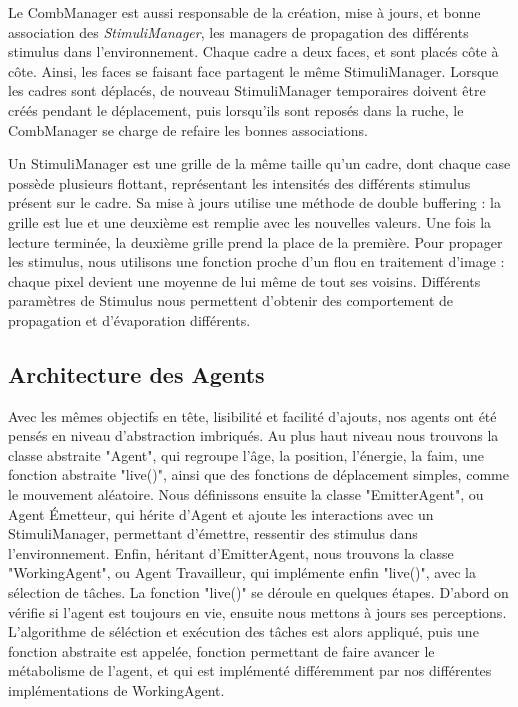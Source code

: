 			Le CombManager est aussi responsable de la création, mise à jours, et bonne association des \textit{StimuliManager}, les managers de propagation des différents stimulus dans l'environnement. Chaque cadre a deux faces, et sont placés côte à côte. Ainsi, les faces se faisant face partagent le même StimuliManager. Lorsque les cadres sont déplacés, de nouveau StimuliManager temporaires doivent être créés pendant le déplacement, puis lorsqu'ils sont reposés dans la ruche, le CombManager se charge de refaire les bonnes associations.
			
			Un StimuliManager est une grille de la même taille qu'un cadre, dont chaque case possède plusieurs flottant, représentant les intensités des différents stimulus présent sur le cadre. Sa mise à jours utilise une méthode de double buffering : la grille est lue et une deuxième est remplie avec les nouvelles valeurs. Une fois la lecture terminée, la deuxième grille prend la place de la première. Pour propager les stimulus, nous utilisons une fonction proche d'un flou en traitement d'image : chaque pixel devient une moyenne de lui même de tout ses voisins. Différents paramètres de Stimulus nous permettent d'obtenir des comportement de propagation et d'évaporation différents.
			
			\subsection{Architecture des Agents}
			Avec les mêmes objectifs en tête, lisibilité et facilité d'ajouts, nos agents ont été pensés en niveau d'abstraction imbriqués. Au plus haut niveau nous trouvons la classe abstraite "Agent", qui regroupe l'âge, la position, l'énergie, la faim, une fonction abstraite "live()", ainsi que des fonctions de déplacement simples, comme le mouvement aléatoire. Nous définissons ensuite la classe "EmitterAgent", ou Agent Émetteur, qui hérite d'Agent et ajoute les interactions avec un StimuliManager, permettant d'émettre, ressentir des stimulus dans l'environnement. Enfin, héritant d'EmitterAgent, nous trouvons la classe "WorkingAgent", ou Agent Travailleur, qui implémente enfin "live()", avec la sélection de tâches. La fonction "live()" se déroule en quelques étapes. D'abord on vérifie si l'agent est toujours en vie, ensuite nous mettons à jours ses perceptions. L'algorithme de séléction et exécution des tâches est alors appliqué, puis une fonction abstraite est appelée, fonction permettant de faire avancer le métabolisme de l'agent, et qui est implémenté différemment par nos différentes implémentations de WorkingAgent.
			
